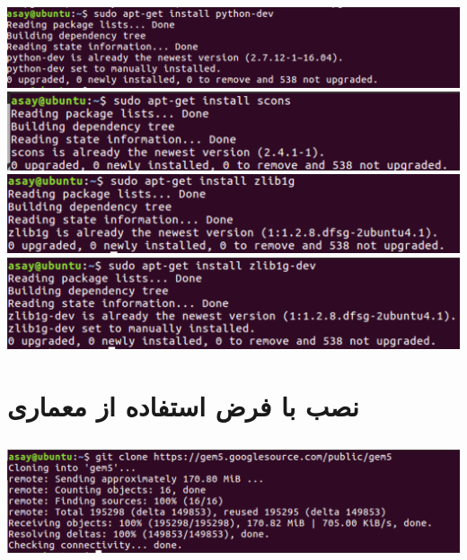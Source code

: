 \documentclass{article}
\begin{document}
\begin{center}
							\includegraphics[width=1\textwidth]{python-dev}
							\includegraphics[width=1\textwidth]{scons}
							\includegraphics[width=1\textwidth]{zlib1g}
							\includegraphics[width=1\textwidth]{zlib1g-dev}
						
					
						
						
	\end{center}



\section*{نصب 
	با فرض استفاده از معماری 
	 }
\subsection*{\textcolor{red}{}}
\begin{center}
								\includegraphics[width=1\textwidth]{gem5-clone}
\end{center}
\subsection*{\textcolor{red}{}}
\end{document}
